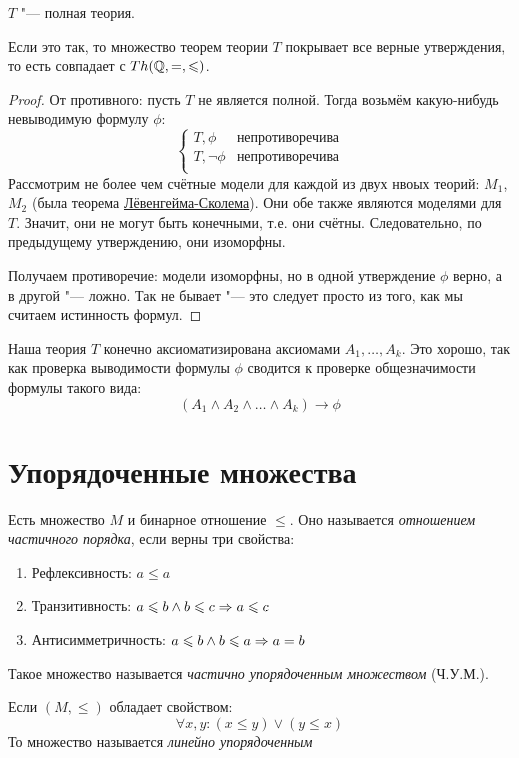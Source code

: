 \begin{assertion}
	$T$ "--- полная теория.
\end{assertion}
\begin{Rem}
	Если это так, то множество теорем теории $T$ покрывает все верные утверждения,
	то есть совпадает с $Th(\mathbb{Q}, =, \leqslant)$.
\end{Rem}
\begin{proof}
	От противного: пусть $T$ не является полной.
	Тогда возьмём какую-нибудь невыводимую формулу $\phi$:
	\[
		\begin{cases}
			T, \phi & \text{непротиворечива} \\
			T, \lnot\phi & \text{непротиворечива} \\
		\end{cases}
	\]
	Рассмотрим не более чем счётные модели для каждой из двух нвоых теорий: $M_1$, $M_2$
	(была теорема \hyperref[lowenheim]{Лёвенгейма-Сколема}).
	Они обе также являются моделями для $T$.
	Значит, они не могут быть конечными, т.е. они счётны.
	Следовательно, по предыдущему утверждению, они изоморфны.

	Получаем противоречие: модели изоморфны, но в одной утверждение $\phi$ верно,
	а в другой "--- ложно.
	Так не бывает "--- это следует просто из того, как мы считаем истинность формул.
\end{proof}

\begin{Rem}
	Наша теория $T$ конечно аксиоматизирована аксиомами $A_1, \dots, A_k$.
	Это хорошо, так как проверка выводимости формулы $\phi$ сводится к проверке
	общезначимости формулы такого вида:
	\[ (A_1 \land A_2 \land \dots \land A_k) \to \phi \]
\end{Rem}

\chapter{Упорядоченные множества} 
\begin{Def}
	Есть множество $M$ и бинарное отношение $\le$.
	Оно называется \textit{отношением частичного порядка}, если верны три свойства:
	\begin{enumerate}
		\item Рефлексивность: $a \le a$ 
		\item Транзитивность: $a \leqslant b \land b \leqslant c \Rightarrow a \leqslant c$
		\item Антисимметричность: $a \leqslant b \land b \leqslant a \Rightarrow a = b$
	\end{enumerate}
	Такое множество называется \textit{частично упорядоченным множеством} (Ч.У.М.).
\end{Def}
\begin{Def}
	Если $(M, \le)$ обладает свойством:
	\[ \forall x, y \colon (x \le y) \lor (y \le x) \]
	То множество называется \textit{линейно упорядоченным}
\end{Def}

